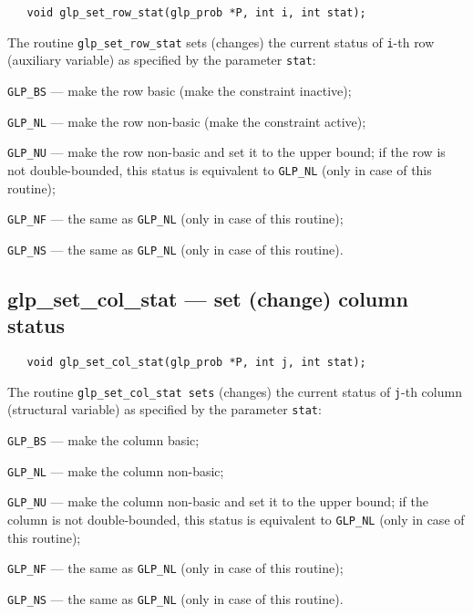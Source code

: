 \synopsis

\begin{verbatim}
   void glp_set_row_stat(glp_prob *P, int i, int stat);
\end{verbatim}

\description

The routine \verb|glp_set_row_stat| sets (changes) the current status
of \verb|i|-th row (auxiliary variable) as specified by the parameter
\verb|stat|:

\verb|GLP_BS| --- make the row basic (make the constraint inactive);

\verb|GLP_NL| --- make the row non-basic (make the constraint active);

\verb|GLP_NU| --- make the row non-basic and set it to the upper bound;
if the row is not double-bounded, this status is equivalent to
\verb|GLP_NL| (only in case of this routine);

\verb|GLP_NF| --- the same as \verb|GLP_NL| (only in case of this
routine);

\verb|GLP_NS| --- the same as \verb|GLP_NL| (only in case of this
routine).

\newpage

\subsection{glp\_set\_col\_stat --- set (change) column status}

\synopsis

\begin{verbatim}
   void glp_set_col_stat(glp_prob *P, int j, int stat);
\end{verbatim}

\description

The routine \verb|glp_set_col_stat sets| (changes) the current status
of \verb|j|-th column (structural variable) as specified by the
parameter \verb|stat|:

\verb|GLP_BS| --- make the column basic;

\verb|GLP_NL| --- make the column non-basic;

\verb|GLP_NU| --- make the column non-basic and set it to the upper
bound; if the column is not double-bounded, this status is equivalent
to \verb|GLP_NL| (only in case of this routine);

\verb|GLP_NF| --- the same as \verb|GLP_NL| (only in case of this
routine);

\verb|GLP_NS| --- the same as \verb|GLP_NL| (only in case of this
routine).


